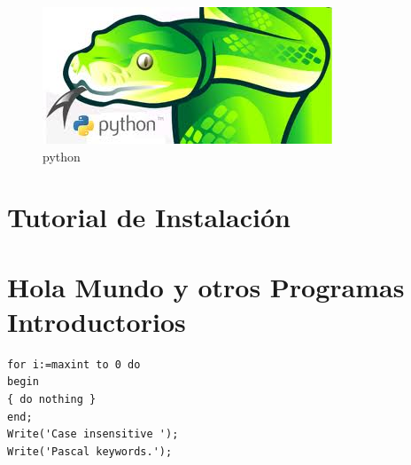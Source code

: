 \documentclass[11pt]{article} %
\begin{document}
\begin{figure}[htbp]
	\begin{center}
		\includegraphics[width=.50\textwidth]{./imagenes/python1.png}
		\caption{python}
		\label{python}
	\end{center}
\end{figure}

\section{Tutorial de Instalación}
\section{Hola Mundo y otros Programas Introductorios}

\lstset{language=Pascal}          %

\begin{lstlisting}[frame=single]  % Start your code-block
for i:=maxint to 0 do
begin
{ do nothing }
end;
Write('Case insensitive ');
Write('Pascal keywords.');
\end{lstlisting}
\end{document}
